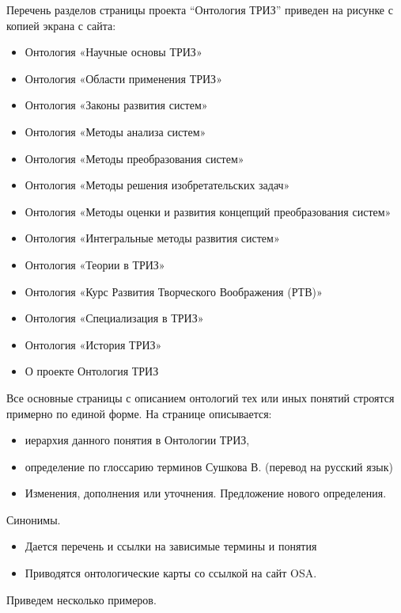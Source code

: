 \documentclass[11pt,a4paper]{article}
\begin{document}
Перечень разделов страницы проекта “Онтология ТРИЗ” приведен на рисунке с
копией экрана с сайта:
\begin{itemize}[noitemsep]
\item Онтология «Научные основы ТРИЗ»
\item Онтология «Области применения ТРИЗ»
\item Онтология «Законы развития систем» 
\item Онтология «Методы анализа систем»
\item Онтология «Методы преобразования систем»
\item Онтология «Методы решения изобретательских задач»
\item Онтология «Методы оценки и развития концепций преобразования систем»
\item Онтология «Интегральные методы развития систем»
\item Онтология «Теории в ТРИЗ»
\item Онтология «Курс Развития Творческого Воображения (РТВ)»
\item Онтология «Специализация в ТРИЗ»
\item Онтология «История ТРИЗ»
\item О проекте Онтология ТРИЗ
\end{itemize}
Все основные страницы с описанием
онтологий тех или иных понятий строятся примерно по единой форме. На странице
описывается: 
\begin{itemize}[noitemsep]
\item иерархия данного понятия в Онтологии ТРИЗ,
\item определение по глоссарию терминов Сушкова В. (перевод на русский язык)
\item Изменения, дополнения или уточнения. Предложение нового определения.
\end{itemize}
Синонимы.  
\begin{itemize}
\item Дается перечень и ссылки на зависимые термины и понятия 
\item Приводятся онтологические карты со ссылкой на сайт OSA.
\end{itemize}
Приведем несколько примеров.
\end{document}
